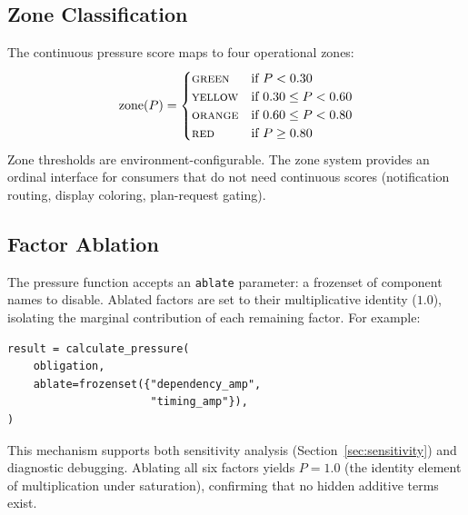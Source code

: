 \documentclass[11pt]{article}
\begin{document}
\subsection{Zone Classification}
\label{sec:zones}

The continuous pressure score maps to four operational zones:
\begin{equation}
\text{zone}(P) =
\begin{cases}
  \textsc{green}  & \text{if } P < 0.30 \\
  \textsc{yellow} & \text{if } 0.30 \leq P < 0.60 \\
  \textsc{orange} & \text{if } 0.60 \leq P < 0.80 \\
  \textsc{red}    & \text{if } P \geq 0.80
\end{cases}
\end{equation}
Zone thresholds are environment-configurable.  The zone system
provides an ordinal interface for consumers that do not need
continuous scores (notification routing, display coloring,
plan-request gating).

\subsection{Factor Ablation}
\label{sec:ablation}

The pressure function accepts an \texttt{ablate} parameter: a
frozenset of component names to disable.  Ablated factors are set
to their multiplicative identity ($1.0$), isolating the marginal
contribution of each remaining factor.  For example:

\begin{lstlisting}[caption={Ablating dependency and timing factors.},
  label=lst:ablate]
result = calculate_pressure(
    obligation,
    ablate=frozenset({"dependency_amp",
                      "timing_amp"}),
)
\end{lstlisting}

This mechanism supports both sensitivity analysis
(Section~\ref{sec:sensitivity}) and diagnostic debugging.  Ablating
all six factors yields $P = 1.0$ (the identity element of
multiplication under saturation), confirming that no hidden additive
terms exist.
\end{document}
